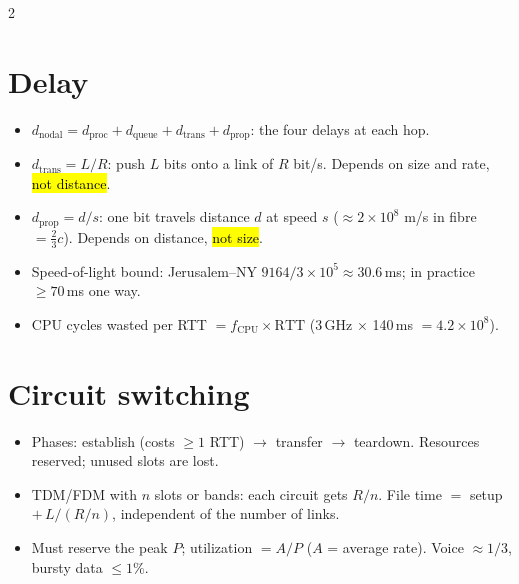 \begin{multicols}{2}

\section{Delay}
\begin{itemize}
  \item $d_{\text{nodal}}=d_{\text{proc}}+d_{\text{queue}}+d_{\text{trans}}+d_{\text{prop}}$: the four delays at each hop.
  \item $d_{\text{trans}}=L/R$: push $L$ bits onto a link of $R$ bit/s. Depends on size and rate, \hl{not distance}.
  \item $d_{\text{prop}}=d/s$: one bit travels distance $d$ at speed $s$ ($\approx2\times10^8$ m/s in fibre $=\frac23c$). Depends on distance, \hl{not size}.
  \item Speed-of-light bound: Jerusalem--NY $9164/3\times10^5\approx30.6$\,ms; in practice $\ge70$\,ms one way.
  \item CPU cycles wasted per RTT $=f_{\text{CPU}}\times\text{RTT}$ (3\,GHz $\times$ 140\,ms $=4.2\times10^8$).
\end{itemize}

\section{Circuit switching}
\begin{itemize}
  \item Phases: establish (costs $\ge1$ RTT) $\to$ transfer $\to$ teardown. Resources reserved; unused slots are lost.
  \item TDM/FDM with $n$ slots or bands: each circuit gets $R/n$. File time $=$ setup $+\,L/(R/n)$, independent of the number of links.
  \item Must reserve the peak $P$; utilization $=A/P$ ($A$ = average rate). Voice $\approx1/3$, bursty data $\le1\%$.
\end{itemize}


\end{multicols}

